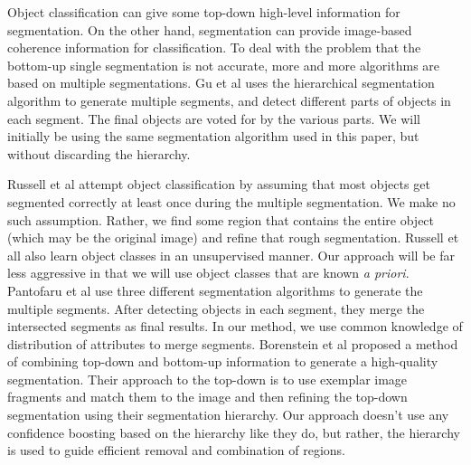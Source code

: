 \documentclass[10pt,twocolumn,letterpaper]{article}
\begin{document}
Object classification can give some top-down high-level information
for segmentation. On the other hand, segmentation can provide
image-based coherence information for classification. To deal with
the problem that the bottom-up single segmentation is not accurate,
more and more algorithms are based on multiple segmentations. Gu et
al \cite{gu09} uses the hierarchical segmentation algorithm to
generate multiple segments, and detect different parts of objects in
each segment. The final objects are voted for by the various parts.
We will initially be using the same segmentation algorithm used in
this paper, but without discarding the hierarchy.

Russell et al \cite{russell06} attempt object classification 
by assuming that most objects get segmented
correctly at least once during the multiple segmentation. We make no such
assumption.  Rather, we find some region that contains the entire
object (which may be the original image) and refine that rough
segmentation.  Russell et all also learn object classes in an
unsupervised manner.  Our approach
will be far less aggressive in that we will use object classes 
that are known \emph{a priori}.
Pantofaru et
al \cite{pantofaru} use three different segmentation algorithms to
generate the multiple segments. After detecting objects in each
segment, they merge the intersected segments as final results. In
our method, we use common knowledge of distribution of attributes to
merge segments.
Borenstein et al \cite{borenstein04} proposed a method of combining top-down
and bottom-up information to generate a high-quality segmentation.  Their
approach to the top-down is to use exemplar image fragments and match them
to the image and then refining the top-down segmentation using their
segmentation hierarchy.  Our approach doesn't use any confidence boosting based
on the hierarchy like they do, but rather, the hierarchy is used to guide
efficient removal and combination of regions.

\end{document}
